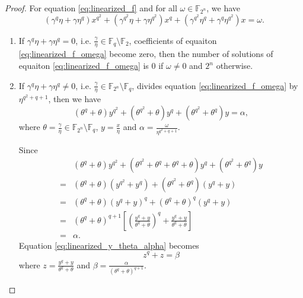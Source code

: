 \documentclass[12 pt]{article}
\def\F{{\mathbb F}}
\begin{document}
\begin{proof}
  For equation \eqref{eq:linearized_f} and for all $ \omega\in\F_{2^n} $, we have 
  \begin{equation}\label{eq:linearized_f_omega}
    \left( \gamma^q\eta+\gamma\eta^q \right)x^{q^2}+\left( \gamma^{q^2}\eta+\gamma\eta^{q^2} \right)x^q+\left( \gamma^{q^2}\eta^q+\gamma^q\eta^{q^2} \right)x = \omega.
  \end{equation}
  \begin{enumerate}[label=(\arabic{*})]
    \item If $ \gamma^q\eta+\gamma\eta^q=0 $, i.e. $ \frac{\gamma}{\eta}\in\F_q\setminus\F_2 $, 
    coefficients of equaiton \eqref{eq:linearized_f_omega} become zero, then the number of solutions of equaiton \eqref{eq:linearized_f_omega} 
    is $ 0 $ if $ \omega\ne 0 $ and $ 2^n $ otherwise.
    \item If $ \gamma^q\eta+\gamma\eta^q\ne 0 $, i.e. $ \frac{\gamma}{\eta}\in\F_{2^n}\setminus\F_q $, 
    divides equation \eqref{eq:linearized_f_omega} by $ \eta^{q^2+q+1} $, then we have 
    \begin{equation}\label{eq:linearized_y_theta_alpha}
      \left( \theta^q+\theta \right)y^{q^2}+\left( \theta^{q^2}+\theta \right)y^q+\left( \theta^{q^2}+\theta^q \right)y = \alpha,
    \end{equation}
    where $ \theta=\frac{\gamma}{\eta}\in\F_{2^n}\setminus\F_q $, 
    $ y=\frac{x}{\eta} $ and $ \alpha=\frac{\omega}{\eta^{q^2+q+1}} $.

    Since 
    \begin{align*}
      &\left( \theta^q+\theta \right)y^{q^2}+\left( \theta^{q^2}+\theta^q+\theta^q+\theta \right)y^q+\left( \theta^{q^2}+\theta^q \right)y\\ 
      =& \left( \theta^q+\theta \right)(y^{q^2}+y^q)+\left( \theta^{q^2}+\theta^q \right)(y^q+y)\\
      =& \left( \theta^q+\theta \right)(y^{q}+y)^q+\left( \theta^{q}+\theta \right)^q(y^q+y)\\
      =& \left( \theta^q+\theta \right)^{q+1}\left[ \left(\frac{y^{q}+y}{\theta^q+\theta}\right)^q+\frac{y^q+y}{\theta^q+\theta} \right]\\
      =&\alpha.
    \end{align*}
    Equation \eqref{eq:linearized_y_theta_alpha} becomes 
    \begin{equation}\label{eq:dontnkwb}
      z^q+z=\beta
    \end{equation}
    where $ z=\frac{y^q+y}{\theta^q+\theta} $ and $ \beta=\frac{\alpha}{\left( \theta^q+\theta \right)^{q+1}} $.


\end{enumerate}
\end{proof}
\end{document}
